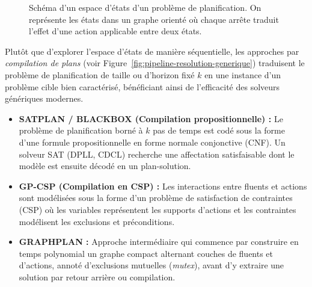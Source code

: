 \begin{figure}[htpb]
    \centering
    \caption{Schéma d'un espace d'états d'un problème de planification. On représente les états dans un graphe orienté où chaque arrête traduit l'effet d'une action applicable entre deux états.}
    \label{fig:graph-states}
\end{figure}

Plutôt que d'explorer l'espace d'états de manière séquentielle, les approches par \emph{compilation de plans} (voir Figure~\ref{fig:pipeline-resolution-generique}) traduisent le problème de planification de taille ou d'horizon fixé $k$ en une instance d'un problème cible bien caractérisé, bénéficiant ainsi de l'efficacité des solveurs génériques modernes.

\begin{itemize}
    \item \textbf{SATPLAN / BLACKBOX (Compilation propositionnelle) :} Le problème de planification borné à $k$ pas de temps est codé sous la forme d'une formule propositionnelle en forme normale conjonctive (CNF). Un solveur SAT (DPLL, CDCL) recherche une affectation satisfaisable dont le modèle est ensuite décodé en un plan-solution.
    
    \item \textbf{GP-CSP (Compilation en CSP) :} Les interactions entre fluents et actions sont modélisées sous la forme d'un problème de satisfaction de contraintes (CSP) où les variables représentent les supports d'actions et les contraintes modélisent les exclusions et préconditions.
    
    \item \textbf{GRAPHPLAN :} Approche intermédiaire qui commence par construire en temps polynomial un graphe compact alternant couches de fluents et d'actions, annoté d'exclusions mutuelles (\emph{mutex}), avant d'y extraire une solution par retour arrière ou compilation.
\end{itemize}

